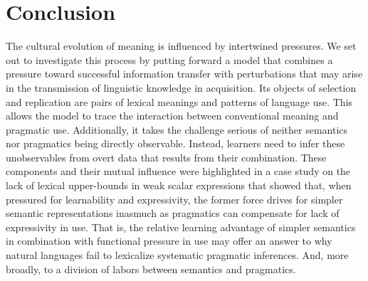 \documentclass[a4paper, 11pt]{article}
\begin{document}
\section{Conclusion}
The cultural evolution of meaning is influenced by intertwined pressures. We set out to investigate this process by putting forward a model that combines a pressure toward successful information transfer with perturbations that may arise in the transmission of linguistic knowledge in acquisition. Its objects of selection and replication are pairs of lexical meanings and patterns of language use. This allows the model to trace the interaction between conventional meaning and pragmatic use. Additionally, it takes the challenge serious of neither semantics nor pragmatics being directly observable. Instead, learners need to infer these unobservables from overt data that results from their combination.  These components and their mutual influence were highlighted in a case study on the lack of lexical upper-bounds in weak scalar expressions that showed that, when pressured for learnability and expressivity, the former force drives for simpler semantic representations inasmuch as pragmatics can compensate for lack of expressivity in use. That is, the relative learning advantage of simpler semantics in combination with functional pressure in use may offer an answer to why natural languages fail to lexicalize systematic pragmatic inferences. And, more broadly, to a division of labors between semantics and pragmatics.




\end{document}
